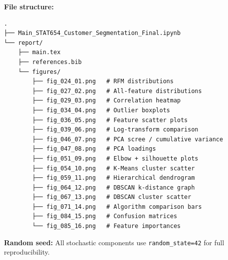 \documentclass[12pt,a4paper]{article}
\begin{document}
\textbf{File structure:}
\begin{verbatim}
.
├── Main_STAT654_Customer_Segmentation_Final.ipynb
└── report/
    ├── main.tex
    ├── references.bib
    └── figures/
        ├── fig_024_01.png   # RFM distributions
        ├── fig_027_02.png   # All-feature distributions
        ├── fig_029_03.png   # Correlation heatmap
        ├── fig_034_04.png   # Outlier boxplots
        ├── fig_036_05.png   # Feature scatter plots
        ├── fig_039_06.png   # Log-transform comparison
        ├── fig_046_07.png   # PCA scree / cumulative variance
        ├── fig_047_08.png   # PCA loadings
        ├── fig_051_09.png   # Elbow + silhouette plots
        ├── fig_054_10.png   # K-Means cluster scatter
        ├── fig_059_11.png   # Hierarchical dendrogram
        ├── fig_064_12.png   # DBSCAN k-distance graph
        ├── fig_067_13.png   # DBSCAN cluster scatter
        ├── fig_071_14.png   # Algorithm comparison bars
        ├── fig_084_15.png   # Confusion matrices
        └── fig_085_16.png   # Feature importances
\end{verbatim}

\textbf{Random seed:} All stochastic components use \texttt{random\_state=42}
for full reproducibility.

\printbibliography[heading=bibintoc,title={References}]
\end{document}
